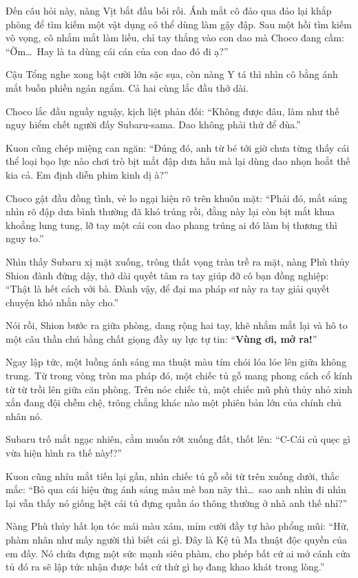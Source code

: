 \documentclass[../main.tex]{subfiles}
\begin{document}
Đến câu hỏi này, nàng Vịt bắt đầu bối rối. Ánh mắt cô đảo qua đảo lại khắp phòng để tìm kiếm một vật dụng có thể dùng làm gậy đập. Sau một hồi tìm kiếm vô vọng, cô nhắm mắt làm liều, chỉ tay thẳng vào con dao mà Choco đang cầm:
``Ờm\dots\ Hay là ta dùng cái cán của con dao đó đi ạ?''

Cậu Tổng nghe xong bật cười lớn sặc sụa, còn nàng Y tá thì nhìn cô bằng ánh mắt buồn phiền ngán ngẩm. Cả hai cùng lắc đầu thở dài.

Choco lắc đầu nguầy nguậy, kịch liệt phản đối:
``Không được đâu, làm như thế nguy hiểm chết người đấy Subaru-sama. Dao không phải thứ để đùa.''

Kuon cũng chép miệng can ngăn:
``Đúng đó, anh từ bé tới giờ chưa từng thấy cái thể loại bạo lực nào chơi trò bịt mắt đập dưa hấu mà lại dùng dao nhọn hoắt thế kia cả. Em định diễn phim kinh dị à?''

Choco gật đầu đồng tình, vẻ lo ngại hiện rõ trên khuôn mặt:
``Phải đó, mắt sáng nhìn rõ đập dưa bình thường đã khó trúng rồi, đằng này lại còn bịt mắt khua khoắng lung tung, lỡ tay một cái con dao phang trúng ai đó làm bị thương thì nguy to.''

Nhìn thấy Subaru xị mặt xuống, trông thất vọng tràn trề ra mặt, nàng Phù thủy Shion đành đứng dậy, thở dài quyết tâm ra tay giúp đỡ cô bạn đồng nghiệp:
``Thật là hết cách với bà. Đành vậy, để đại ma pháp sư này ra tay giải quyết chuyện khó nhằn này cho.''

Nói rồi, Shion bước ra giữa phòng, dang rộng hai tay, khẽ nhắm mắt lại và hô to một câu thần chú bằng chất giọng đầy uy lực tự tin:
``\textbf{Vùng ơi, mở ra!}''

Ngay lập tức, một luồng ánh sáng ma thuật màu tím chói lóa lóe lên giữa không trung. Từ trong vòng tròn ma pháp đó, một chiếc tủ gỗ mang phong cách cổ kính từ từ trồi lên giữa căn phòng. Trên nóc chiếc tủ, một chiếc mũ phù thủy nhỏ xinh xắn đang đội chễm chệ, trông chẳng khác nào một phiên bản lớn của chính chủ nhân nó.


Subaru trố mắt ngạc nhiên, cằm muốn rớt xuống đất, thốt lên:
``C-Cái củ quẹc gì vừa hiện hình ra thế này!?''

Kuon cũng nhíu mắt tiến lại gần, nhìn chiếc tủ gỗ sồi từ trên xuống dưới, thắc mắc:
``Bỏ qua cái hiệu ứng ánh sáng màu mè ban nãy thì\dots\ sao anh nhìn đi nhìn lại vẫn thấy nó giống hệt cái tủ đựng quần áo thông thường ở nhà anh thế nhỉ?''

Nàng Phù thủy hất lọn tóc mái màu xám, mỉm cười đầy tự hào phổng mũi:
``Hừ, phàm nhân như mấy người thì biết cái gì. Đây là Kệ tủ Ma thuật độc quyền của em đấy. Nó chứa đựng một sức mạnh siêu phàm, cho phép bất cứ ai mở cánh cửa tủ đó ra sẽ lập tức nhận được bất cứ thứ gì họ đang khao khát trong lòng.''
\end{document}
